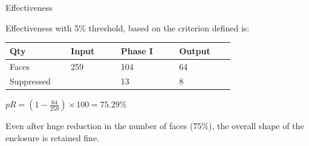 \begin{frame}{Effectiveness}

Effectiveness with 5\% threshold, based on the criterion defined is:


\begin{tabular}[h]{@{} p{0.22\linewidth} p{0.18\linewidth} p{0.21\linewidth} p{0.2\linewidth} @{}}\toprule
\textbf{Qty} & \textbf{Input} & \textbf{Phase I} & \textbf{Output}\\  \midrule
Faces  & 259 & 104 & 64\\
Suppressed  &  &13 & 8\\
\bottomrule
\end{tabular}

\bigskip

$pR = (1 - \frac{64}{259}) \times 100 = 75.29\%$

\bigskip

Even after huge reduction in the number of faces (75\%), the overall shape of the enclosure is retained fine.

\end{frame}

